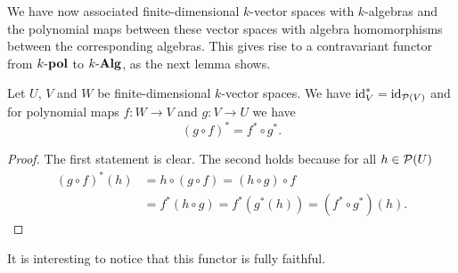 We have now associated finite-dimensional $k$-vector spaces with $k$-algebras and the polynomial maps between these vector spaces with algebra homomorphisms between the corresponding algebras. This gives rise to a contravariant functor from $k\text{-}\mathbf{pol}$ to $k\text{-}\mathbf{Alg}$, as the next lemma shows.


\begin{prop}
 Let $U$, $V$ and $W$ be finite-dimensional $k$-vector spaces. We have $\operatorname{id}_V^* = \operatorname{id}_{\mathcal{P}(V)}$ and for polynomial maps $f : W \to V$ and $g : V \to U$ we have
 \[
  (g \circ f)^* = f^* \circ g^*.
 \]
\end{prop}
\begin{proof}
 The first statement is clear. The second holds because for all $h \in \mathcal{P}(U)$
 \begin{align*}
  (g \circ f)^*(h)
  &= h \circ (g \circ f) = (h \circ g) \circ f \\
  &= f^* (h \circ g) = f^*(g^*(h)) = (f^* \circ g^*)(h).
 \end{align*}
\end{proof}


It is interesting to notice that this functor is fully faithful.


